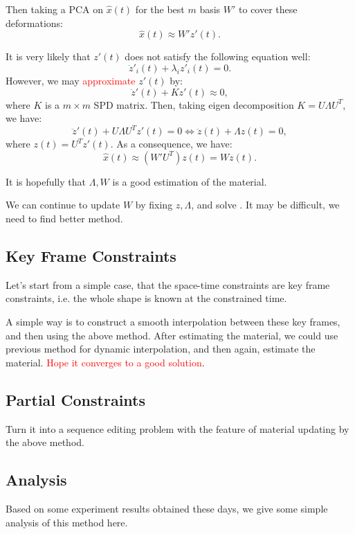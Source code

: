\documentclass[9pt,twocolumn]{extarticle}
\newcommand{\TODO}[1]{\textcolor{red}{#1}}
\begin{document}
Then taking a PCA on $\hat{x}(t)$ for the best $m$ basis $W'$ to cover
these deformations:
\begin{equation}
  \hat{x}(t) \approx W'z'(t).
\end{equation}

It is very likely that $z'(t)$ does not satisfy the following equation
well:
\begin{equation}
  \ddot{z}'_i(t) + \lambda_i z'_i(t) = 0.
\end{equation}
However, we may \TODO{approximate} $z'(t)$ by:
\begin{equation}
  \ddot{z}'(t) + K z'(t) \approx 0,
\end{equation}
where $K$ is a $m \times m$ SPD matrix.  Then, taking eigen
decomposition $K=U\Lambda U^T$, we have:
\begin{equation}
  \ddot{z}'(t) + U\Lambda U^T z'(t) = 0 \Leftrightarrow \ddot{z}(t) + \Lambda z(t) = 0,
\end{equation}
where $z(t)=U^Tz'(t)$.  As a consequence, we have:
\begin{equation}
  \hat{x}(t) \approx (W'U^T) z(t) = W z(t).
\end{equation}

It is hopefully that $\Lambda, W$ is a good estimation of the material.

We can continue to update $W$ by fixing $z, \Lambda$, and solve
.  It may be difficult, we need to find better
method.

\subsection{Key Frame Constraints}
Let's start from a simple case, that the space-time constraints are
key frame constraints, i.e. the whole shape is known at the
constrained time.

A simple way is to construct a smooth interpolation between these key
frames, and then using the above method.  After estimating the
material, we could use previous method for dynamic interpolation, and
then again, estimate the material.  \TODO{Hope it converges to a good
  solution}.

\subsection{Partial Constraints}
Turn it into a sequence editing problem with the feature of material
updating by the above method.

\subsection{Analysis}
Based on some experiment results obtained these days, we give some simple
analysis of this method here.
\end{document}
